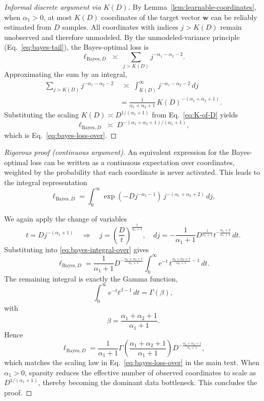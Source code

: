 \documentclass[11pt]{article}
\theoremstyle{plain}
\theoremstyle{definition}
\theoremstyle{remark}
\newcommand{\JSCheck}[1]{#1}
\begin{document}
\begin{proof}[\JSCheck{Informal discrete argument via $K(D)$}]
By Lemma~\ref{lem:learnable-coordinates}, when $\alpha_1>0$, at most $K(D)$ coordinates of the
target vector $\mathbf{w}$ can be reliably estimated from $D$ samples. All
coordinates with indices $j > K(D)$ remain unobserved and therefore unmodeled.
By the unmodeled-variance principle (Eq.~\eqref{eq:bayes-tail}), the
Bayes-optimal loss is
\[
\ell_{\mathrm{Bayes},D}
\;\asymp\;
\sum_{j > K(D)} j^{-\alpha_1 - \alpha_2 - 2}.
\]
Approximating the sum by an integral,
\[
\begin{aligned}
\sum_{j > K(D)} j^{-\alpha_1 - \alpha_2 - 2}
&\;\asymp\;
\int_{K(D)}^\infty j^{-\alpha_1 - \alpha_2 - 2}\, dj
\\
&=
\frac{1}{\alpha_1 + \alpha_2 + 1}\,
K(D)^{-(\alpha_1+\alpha_2+1)}.
\end{aligned}
\]
Substituting the scaling $K(D) \asymp D^{1/(\alpha_1+1)}$ from
Eq.~\eqref{eq:K-of-D} yields
\[
\ell_{\mathrm{Bayes},D}
\;\asymp\;
D^{-(\alpha_1+\alpha_2+1)/(\alpha_1+1)},
\]
which is Eq.~\eqref{eq:bayes-loss-over}.
\end{proof}

\begin{proof}[\JSCheck{Rigorous} proof (continuous argument)]
An equivalent expression for the Bayes-optimal loss can be written as a continuous expectation over coordinates, weighted by the probability that each
coordinate is never activated. This leads to the integral representation
\begin{equation}
\ell_{\mathrm{Bayes},D}
=
\int_{0}^{\infty}
\exp\!\left(-D j^{-\alpha_1 - 1}\right)\,
j^{-(\alpha_1 + \alpha_2 + 2)}\, dj,
\label{eq:bayes-integral-over}
\end{equation}

We again apply the change of variables
\[
t = D j^{-(\alpha_1+1)}
\quad\Longrightarrow\quad
j = \left(\frac{D}{t}\right)^{\frac{1}{\alpha_1+1}},
\quad
dj
= -\frac{1}{\alpha_1+1}
D^{\frac{1}{\alpha_1+1}}
t^{-\frac{\alpha_1+2}{\alpha_1+1}}\, dt.
\]
Substituting into \eqref{eq:bayes-integral-over} gives
\[
\ell_{\mathrm{Bayes},D}
=
\frac{1}{\alpha_1+1}
D^{-\frac{\alpha_1+\alpha_2+1}{\alpha_1+1}}
\int_0^\infty
e^{-t}\,
t^{\frac{\alpha_1+\alpha_2+1}{\alpha_1+1}-1}\, dt.
\]
The remaining integral is exactly the Gamma function,
\[
\int_0^\infty e^{-t} t^{\beta-1}\, dt = \Gamma(\beta),
\]
with
\[
\beta = \frac{\alpha_1+\alpha_2+1}{\alpha_1+1}.
\]
Hence
\[
\ell_{\mathrm{Bayes},D}
=
\frac{1}{\alpha_1+1}
\Gamma\!\left(
\frac{\alpha_1+\alpha_2+1}{\alpha_1+1}
\right)
D^{-\frac{\alpha_1+\alpha_2+1}{\alpha_1+1}},
\]
which matches the scaling law in Eq.~\eqref{eq:bayes-loss-over} in the main text. When $\alpha_1>0$, sparsity reduces the effective number of observed coordinates to scale as $D^{1/(\alpha_1+1)}$, thereby becoming the dominant data bottleneck. This concludes the proof.
\end{proof}
\end{document}
